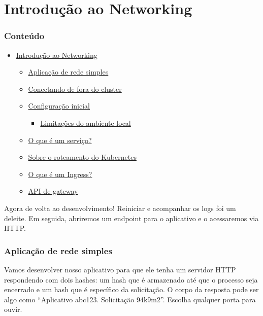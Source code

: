 \documentclass[
]{article}
\author{}
\date{}
\providecommand{\tightlist}{%
  \setlength{\itemsep}{0pt}\setlength{\parskip}{0pt}}
\begin{document}
\section{Introdução ao Networking}\label{introduuxe7uxe3o-ao-networking}

\subsubsection{Conteúdo}\label{conteuxfado}

\begin{itemize}
\tightlist
\item
  \hyperref[introduuxe7uxe3o-ao-networking]{Introdução ao Networking}

  \begin{itemize}
  \tightlist
  \item
    \hyperref[aplicauxe7uxe3o-de-rede-simples]{Aplicação de rede
    simples}
  \item
    \hyperref[conectando-de-fora-do-cluster]{Conectando de fora do
    cluster}
  \item
    \hyperref[configurauxe7uxe3o-inicial]{Configuração inicial}

    \begin{itemize}
    \tightlist
    \item
      \hyperref[limitauxe7uxf5es-do-ambiente-local]{Limitações do
      ambiente local}
    \end{itemize}
  \item
    \hyperref[o-que-uxe9-um-serviuxe7o]{O que é um serviço?}
  \item
    \hyperref[sobre-o-roteamento-do-kubernetes]{Sobre o roteamento do
    Kubernetes}
  \item
    \hyperref[o-que-uxe9-um-ingress]{O que é um Ingress?}
  \item
    \hyperref[api-de-gateway]{API de gateway}
  \end{itemize}
\end{itemize}

Agora de volta ao desenvolvimento! Reiniciar e acompanhar os logs foi um
deleite. Em seguida, abriremos um endpoint para o aplicativo e o
acessaremos via HTTP.

\subsubsection{Aplicação de rede
simples}\label{aplicauxe7uxe3o-de-rede-simples}

Vamos desenvolver nosso aplicativo para que ele tenha um servidor HTTP
respondendo com dois hashes: um hash que é armazenado até que o processo
seja encerrado e um hash que é específico da solicitação. O corpo da
resposta pode ser algo como ``Aplicativo abc123. Solicitação 94k9m2''.
Escolha qualquer porta para ouvir.
\end{document}
